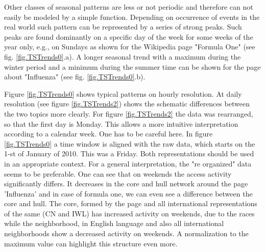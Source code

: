 \documentclass[a4paper,10pt]{scrbook}
\begin{document}
Other classes of seasonal patterns are less or not periodic and therefore can not easily be modeled by a simple function. Depending on occurrence of events in the real world such pattern can be represented by a series of strong peaks. Such peaks are found dominantly on a specific day of the week for some weeks of the year only, e.g., on Sundays as shown for the Wikipedia page "Formula One" (see fig. \ref{fig.TSTrends0}.a). A longer seasonal trend with a maximum during the winter period and a minimum during the summer time can be shown for the page about "Influenza" (see fig. \ref{fig.TSTrends0}.b).

\label{ext.fig.TSTrends2} 


Figure \ref{fig.TSTrends0} shows typical patterns on hourly resolution. At daily resolution (see figure \ref{fig.TSTrends2}) shows the schematic differences between the two topics more clearly. For figure \ref{fig.TSTrends2} the data was rearranged, so that the first day is Monday. This allows a more intuitive interpretation according to a calendar week. One has to be careful here. In figure \ref{fig.TSTrends0} a time window is aligned with the raw data, which starts on the 1-st of January of 2010. This was a Friday. Both representations should be used in an appropriate context. For a general interpretation, the "re organized" data seems to be preferable. 
One can see that on weekends the access activity significantly differs. It decreases in the core and hull network around the page 'Influenza' and in case of formula one, we can even see a difference between the core and hull.
The core, formed by the page and all international representations of the same (CN and IWL) has increased activity on weekends, due to the races while the neighborhood, in English language and also all international neighborhoods show a decreased activity on weekends. A normalization to the maximum value can highlight this structure even more. 
\end{document}
